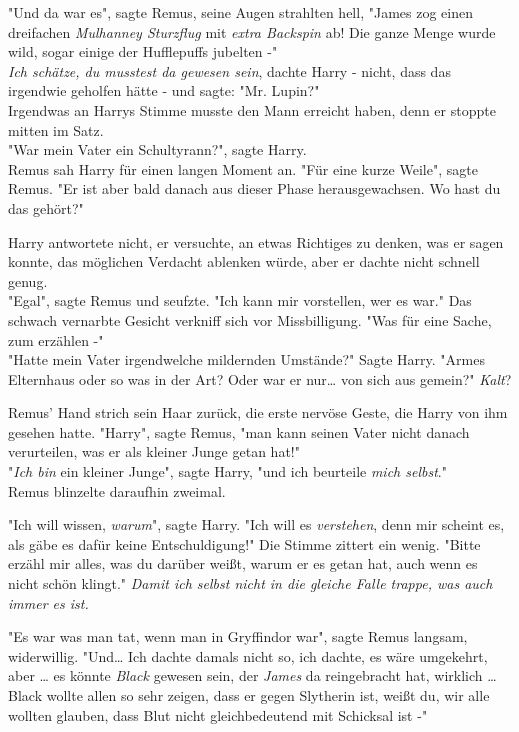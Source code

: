 {"Und da war es", sagte Remus, seine Augen strahlten hell, "James zog einen dreifachen \emph{Mulhanney Sturzflug} mit \emph{extra Backspin} ab! Die ganze Menge wurde wild, sogar einige der Hufflepuffs jubelten -"\\ \emph{Ich schätze, du musstest da gewesen sein}, dachte Harry - nicht, dass das irgendwie geholfen hätte - und sagte: "Mr. Lupin?"\\ Irgendwas an Harrys Stimme musste den Mann erreicht haben, denn er stoppte mitten im Satz.\\ "War mein Vater ein Schultyrann?", sagte Harry.\\ Remus sah Harry für einen langen Moment an. "Für eine kurze Weile", sagte Remus. "Er ist aber bald danach aus dieser Phase herausgewachsen. Wo hast du das gehört?"

Harry antwortete nicht, er versuchte, an etwas Richtiges zu denken, was er sagen konnte, das möglichen Verdacht ablenken würde, aber er dachte nicht schnell genug.\\ "Egal", sagte Remus und seufzte. "Ich kann mir vorstellen, wer es war." Das schwach vernarbte Gesicht verkniff sich vor Missbilligung. "Was für eine Sache, zum erzählen -"\\ "Hatte mein Vater irgendwelche mildernden Umstände?" Sagte Harry. "Armes Elternhaus oder so was in der Art? Oder war er nur… von sich aus gemein?" \emph{Kalt}?

Remus' Hand strich sein Haar zurück, die erste nervöse Geste, die Harry von ihm gesehen hatte. "Harry", sagte Remus, "man kann seinen Vater nicht danach verurteilen, was er als kleiner Junge getan hat!"\\ "\emph{Ich bin} ein kleiner Junge", sagte Harry, "und ich beurteile \emph{mich selbst}."\\ Remus blinzelte daraufhin zweimal.

"Ich will wissen, \emph{warum}", sagte Harry. "Ich will es \emph{verstehen}, denn mir scheint es, als gäbe es dafür keine Entschuldigung!" Die Stimme zittert ein wenig. "Bitte erzähl mir alles, was du darüber weißt, warum er es getan hat, auch wenn es nicht schön klingt." \emph{Damit ich selbst nicht in die gleiche Falle trappe, was auch immer es ist.}

"Es war was man tat, wenn man in Gryffindor war", sagte Remus langsam, widerwillig. "Und… Ich dachte damals nicht so, ich dachte, es wäre umgekehrt, aber … es könnte \emph{Black} gewesen sein, der \emph{James} da reingebracht hat, wirklich … Black wollte allen so sehr zeigen, dass er gegen Slytherin ist, weißt du, wir alle wollten glauben, dass Blut nicht gleichbedeutend mit Schicksal ist -"

}
